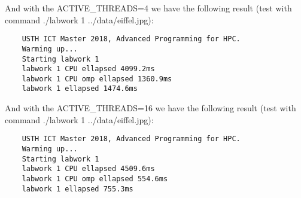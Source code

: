 \documentclass{article}
\begin{document}
And with the ACTIVE\_THREADS=4 we have the following result (test with command ./labwork 1 ../data/eiffel.jpg):
\begin{verbatim}
    USTH ICT Master 2018, Advanced Programming for HPC.
    Warming up...
    Starting labwork 1
    labwork 1 CPU ellapsed 4099.2ms
    labwork 1 CPU omp ellapsed 1360.9ms
    labwork 1 ellapsed 1474.6ms
\end{verbatim}

And with the ACTIVE\_THREADS=16 we have the following result (test with command ./labwork 1 ../data/eiffel.jpg):
\begin{verbatim}
    USTH ICT Master 2018, Advanced Programming for HPC.
    Warming up...
    Starting labwork 1
    labwork 1 CPU ellapsed 4509.6ms
    labwork 1 CPU omp ellapsed 554.6ms
    labwork 1 ellapsed 755.3ms
\end{verbatim}
\end{document}
